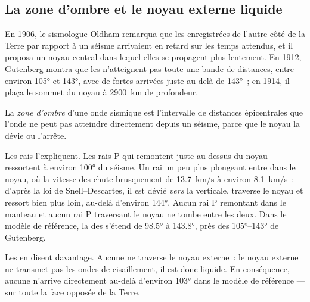 \subsection{La zone d'ombre et le noyau externe liquide}

En 1906, le sismologue Oldham remarqua que les  enregistrées de
l'autre côté de la Terre par rapport à un séisme arrivaient en retard sur
les temps attendus, et il proposa un noyau central dans lequel elles se
propagent plus lentement. En 1912, Gutenberg montra que les 
n'atteignent pas toute une bande de distances, entre environ \ang{105} et
\ang{143}, avec de fortes arrivées juste au-delà de \ang{143}~; en 1914, il
plaça le sommet du noyau à \qty{2900}{km} de profondeur.

\begin{definition}\label{def:g11:seismic-structure:shadow-zone}
La \emph{zone d'ombre} d'une onde sismique est
l'intervalle de distances épicentrales que l'onde ne peut pas atteindre
directement depuis un séisme, parce que le noyau la dévie ou l'arrête.
\end{definition}

Les rais l'expliquent. Les rais P qui remontent juste au-dessus du noyau
ressortent à environ \ang{100} du séisme. Un rai un peu plus plongeant entre
dans le noyau, où la vitesse des  chute brusquement de
\qty{13.7}{km/s} à environ \qty{8.1}{km/s}~: d'après la loi de
Snell--Descartes, il est dévié \emph{vers} la verticale, traverse le noyau
et ressort bien plus loin, au-delà d'environ \ang{144}. Aucun rai P
remontant dans le manteau et aucun rai P traversant le noyau ne tombe entre
les deux. Dans le modèle de référence, la  des  s'étend
de \ang{98.5} à \ang{143.8}, près des \ang{105}--\ang{143} de Gutenberg.

Les  en disent davantage. Aucune  ne traverse le noyau
externe~: le noyau externe ne transmet pas les ondes de cisaillement, il est
donc liquide. En conséquence, aucune  n'arrive directement au-delà
d'environ \ang{103} dans le modèle de référence --- sur toute la face
opposée de la Terre.

